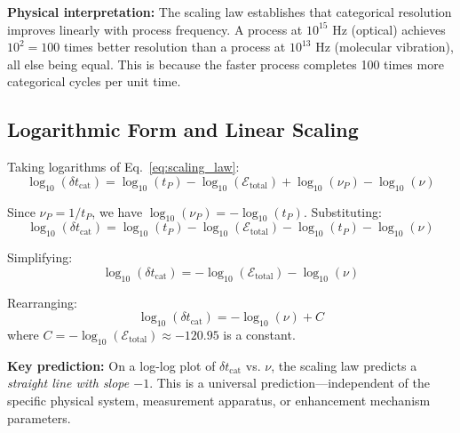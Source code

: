 \documentclass[twocolumn,10pt]{article}
\theoremstyle{remark}
\begin{document}
\textbf{Physical interpretation:} The scaling law establishes that categorical resolution improves linearly with process frequency. A process at $10^{15}$ Hz (optical) achieves $10^2 = 100$ times better resolution than a process at $10^{13}$ Hz (molecular vibration), all else being equal. This is because the faster process completes 100 times more categorical cycles per unit time.

\subsection{Logarithmic Form and Linear Scaling}

Taking logarithms of Eq.~\eqref{eq:scaling_law}:
\begin{equation}
    \log_{10}(\delta t_{\text{cat}}) = \log_{10}(t_P) - \log_{10}(\mathcal{E}_{\text{total}}) + \log_{10}(\nu_P) - \log_{10}(\nu)
    \label{eq:scaling_log}
\end{equation}

Since $\nu_P = 1/t_P$, we have $\log_{10}(\nu_P) = -\log_{10}(t_P)$. Substituting:
\begin{equation}
    \log_{10}(\delta t_{\text{cat}}) = \log_{10}(t_P) - \log_{10}(\mathcal{E}_{\text{total}}) - \log_{10}(t_P) - \log_{10}(\nu)
    \label{eq:scaling_log_simplified}
\end{equation}

Simplifying:
\begin{equation}
    \log_{10}(\delta t_{\text{cat}}) = -\log_{10}(\mathcal{E}_{\text{total}}) - \log_{10}(\nu)
    \label{eq:scaling_log_final}
\end{equation}

Rearranging:
\begin{equation}
    \boxed{\log_{10}(\delta t_{\text{cat}}) = -\log_{10}(\nu) + C}
    \label{eq:scaling_linear}
\end{equation}
where $C = -\log_{10}(\mathcal{E}_{\text{total}}) \approx -120.95$ is a constant.

\textbf{Key prediction:} On a log-log plot of $\delta t_{\text{cat}}$ vs. $\nu$, the scaling law predicts a \textit{straight line with slope $-1$}. This is a universal prediction—independent of the specific physical system, measurement apparatus, or enhancement mechanism parameters.
\end{document}
